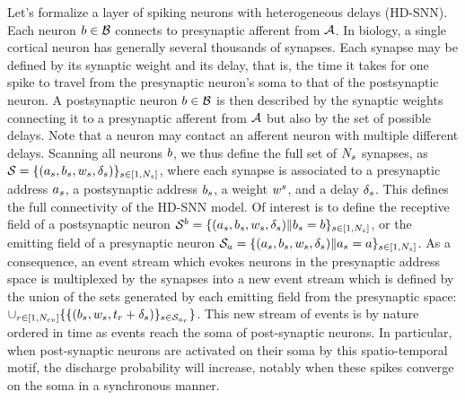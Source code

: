 \documentclass[default]{sn-jnl}%
\theoremstyle{thmstyleone}%
\theoremstyle{thmstyletwo}%
\theoremstyle{thmstylethree}%
\newcommand{\note}[1]{{\sethlcolor{yellow}\hl{#1}}}
\begin{document}
Let's formalize a layer of spiking neurons with heterogeneous delays (HD-SNN). Each neuron $b \in \mathcal{B}$  connects to presynaptic afferent from $\mathcal{A}$. In biology, a single cortical neuron has generally several thousands of synapses. Each synapse may be defined by its synaptic weight and its delay, that is, the time it takes for one spike to travel from the presynaptic neuron's soma to that of the postsynaptic neuron. A postsynaptic neuron $b \in \mathcal{B}$ is then described by the synaptic weights connecting it to a presynaptic afferent from $\mathcal{A}$ but also by the set of possible delays. Note that a neuron may contact an afferent neuron with multiple different delays. Scanning all neurons $b$, we thus define the full set of $N_{s}$ synapses, 
as  $\mathcal{S} = \{(a_s, b_s, w_s, \delta_s)\}_{s \in [1,N_{s}]}$, where each synapse is associated to a presynaptic address $a_s$, a postsynaptic address $b_s$,  a weight $w^s$, and a delay $\delta_s$. This defines the full connectivity of the HD-SNN model. Of interest is to define the receptive field of a postsynaptic neuron $\mathcal{S}^b =  \{(a_s, b_s, w_s, \delta_s) \| b_s=b\}_{s \in [1,N_{s}]} $, or the emitting field of a presynaptic neuron $\mathcal{S}_a =  \{(a_s, b_s, w_s, \delta_s) \| a_s=a\}_{s \in [1,N_{s}]}$. As a consequence, an event stream which evokes neurons in the presynaptic address space is multiplexed by the synapses into a new event stream which is defined by the union of the sets generated by each emitting field from the presynaptic space: 
$ \cup_{r \in [1,N_{ev}]} \{ \{(b_s, w_s, t_r + \delta_s) \}_{ s \in \mathcal{S}_{a_r}} \}$. This new stream of events is by nature ordered in time as events reach the soma of post-synaptic neurons. In particular, when post-synaptic neurons are activated on their soma by this spatio-temporal motif, the discharge probability will increase, notably when these spikes converge on the soma in a synchronous manner. 
\end{document}
